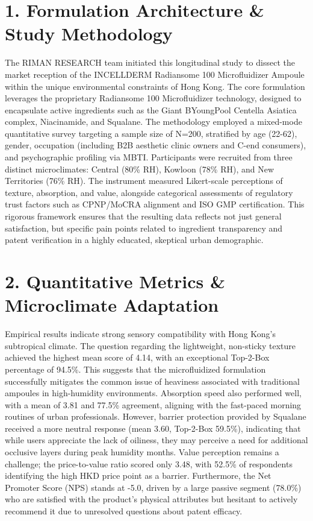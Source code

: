 \documentclass[10pt,twocolumn,a4paper]{article}
\begin{document}
\section{1. Formulation Architecture \& Study Methodology}
The RIMAN RESEARCH team initiated this longitudinal study to dissect the market reception of the INCELLDERM Radiansome 100 Microfluidizer Ampoule within the unique environmental constraints of Hong Kong. The core formulation leverages the proprietary Radiansome 100 Microfluidizer technology, designed to encapsulate active ingredients such as the Giant BYoungPool Centella Asiatica complex, Niacinamide, and Squalane. The methodology employed a mixed-mode quantitative survey targeting a sample size of N=200, stratified by age (22-62), gender, occupation (including B2B aesthetic clinic owners and C-end consumers), and psychographic profiling via MBTI. Participants were recruited from three distinct microclimates: Central (80\% RH), Kowloon (78\% RH), and New Territories (76\% RH). The instrument measured Likert-scale perceptions of texture, absorption, and value, alongside categorical assessments of regulatory trust factors such as CPNP/MoCRA alignment and ISO GMP certification. This rigorous framework ensures that the resulting data reflects not just general satisfaction, but specific pain points related to ingredient transparency and patent verification in a highly educated, skeptical urban demographic.
\section{2. Quantitative Metrics \& Microclimate Adaptation}
Empirical results indicate strong sensory compatibility with Hong Kong's subtropical climate. The question regarding the lightweight, non-sticky texture achieved the highest mean score of 4.14, with an exceptional Top-2-Box percentage of 94.5\%. This suggests that the microfluidized formulation successfully mitigates the common issue of heaviness associated with traditional ampoules in high-humidity environments. Absorption speed also performed well, with a mean of 3.81 and 77.5\% agreement, aligning with the fast-paced morning routines of urban professionals. However, barrier protection provided by Squalane received a more neutral response (mean 3.60, Top-2-Box 59.5\%), indicating that while users appreciate the lack of oiliness, they may perceive a need for additional occlusive layers during peak humidity months. Value perception remains a challenge; the price-to-value ratio scored only 3.48, with 52.5\% of respondents identifying the high HKD price point as a barrier. Furthermore, the Net Promoter Score (NPS) stands at -5.0, driven by a large passive segment (78.0\%) who are satisfied with the product's physical attributes but hesitant to actively recommend it due to unresolved questions about patent efficacy.
\end{document}
